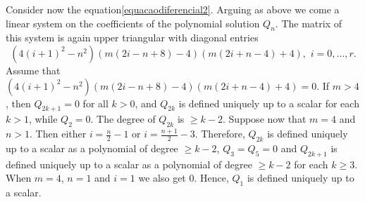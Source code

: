 \documentclass[review,nopreprintline]{elsarticle}
\theoremstyle{definition}
\numberwithin{equation}{section}
\theoremstyle{remark}
\begin{document}
	            
	            
	            
	     
	            
	            Consider now the equation\eqref{equacaodiferencial2}. Arguing as above we come a linear system on the coefficients of the polynomial solution $Q_n$. The matrix of this system is again upper triangular with diagonal entries
	            $$\left(4 (i+1)^2-n^2\right) (m (2 i-n+8)-4) (m (2 i+n-4)+4),\,\, i=0, \ldots, r.$$ 
	          Assume that  $\left(4 (i+1)^2-n^2\right) (m (2 i-n+8)-4) (m (2 i+n-4)+4)=0$. 
	            If $m>4$, then   $Q_{2k+1}=0$ for all $k> 0$, and $Q_{2k}$ is defined  uniquely up to a scalar for each $k> 1$, while $Q_2=0$. The degree of 
	      $Q_{2k}$ is $\geq k-2$.   Suppose now that $m=4$ and $n>1$.  Then either   $i=\frac{n}{2}-1$ or   $i=\frac{n+1}{2}-3$. Therefore, 
	       $Q_{2k}$ is defined uniquely up to a scalar   as a   polynomial of degree $\geq k-2$, $Q_3=Q_5=0$
	       and  $Q_{2k+1}$ is defined uniquely up to a scalar   as a   polynomial of degree $\geq k-2$ for each $k\geq 3$. When $m=4$, $n=1$ and $i=1$ we also get $0$. Hence, $Q_1$   is defined uniquely up to a scalar. 
	     
\end{document}
